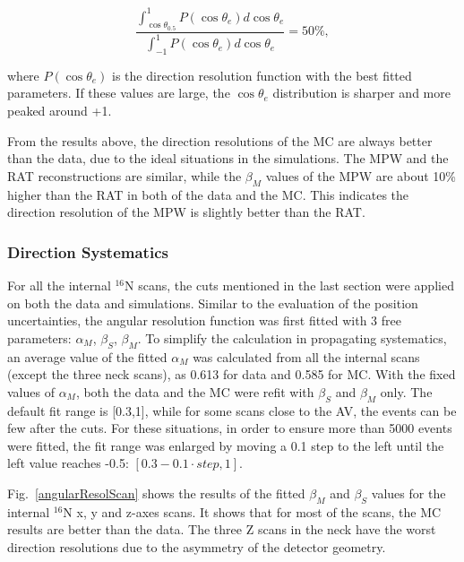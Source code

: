 \begin{equation}\label{eq:cosTheta_e}
\frac{\int_{\cos\theta_{0.5}}^1 P(\cos\theta_e) d\cos\theta_e}{\int_{-1}^1 P(\cos\theta_e) d\cos\theta_e} = 50\%,
\end{equation}

where $P(\cos\theta_e)$ is the direction resolution function with the best fitted parameters. If these values are large, the $\cos\theta_e$ distribution is sharper and more peaked around +1.

From the results above, the direction resolutions of the MC are always better than the data, due to the ideal situations in the simulations. The MPW and the RAT reconstructions are similar, while the $\beta_M$ values of the MPW are about 10\% higher than the RAT in both of the data and the MC. This indicates the direction resolution of the MPW is slightly better than the RAT.

\subsubsection{Direction Systematics}
For all the internal $^{16}$N scans, the cuts mentioned in the last section were applied on both the data and simulations. Similar to the evaluation of the position uncertainties, the angular resolution function was first fitted with 3 free parameters: $\alpha_M$, $\beta_S$, $\beta_M$. To simplify the calculation in propagating systematics, an average value of the fitted $\alpha_M$ was calculated from all the internal scans (except the three neck scans), as 0.613 for data and 0.585 for MC. With the fixed values of $\alpha_M$, both the data and the MC were refit with $\beta_S$ and $\beta_M$ only. The default fit range is [0.3,1], while for some scans close to the AV, the events can be few after the cuts. For these situations, in order to ensure more than 5000 events were fitted, the fit range was enlarged by moving a 0.1 step to the left until the left value reaches -0.5: $[0.3-0.1\cdot step,1]$.

Fig.~\ref{angularResolScan} shows the results of the fitted $\beta_M$ and $\beta_S$ values for the internal $^{16}$N x, y and z-axes scans. It shows that for most of the scans, the MC results are better than the data. The three Z scans in the neck have the worst direction resolutions due to the asymmetry of the detector geometry. 

